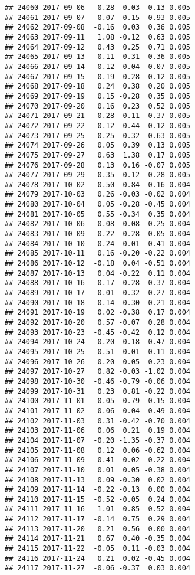 \documentclass[
]{article}
\begin{document}
\begin{verbatim}
## 24060 2017-09-06   0.28 -0.03  0.13 0.005
## 24061 2017-09-07  -0.07  0.15 -0.93 0.005
## 24062 2017-09-08  -0.16  0.03  0.36 0.005
## 24063 2017-09-11   1.08 -0.12  0.63 0.005
## 24064 2017-09-12   0.43  0.25  0.71 0.005
## 24065 2017-09-13   0.11  0.31  0.36 0.005
## 24066 2017-09-14  -0.12 -0.04 -0.07 0.005
## 24067 2017-09-15   0.19  0.28  0.12 0.005
## 24068 2017-09-18   0.24  0.38  0.20 0.005
## 24069 2017-09-19   0.15 -0.28  0.35 0.005
## 24070 2017-09-20   0.16  0.23  0.52 0.005
## 24071 2017-09-21  -0.28  0.11  0.37 0.005
## 24072 2017-09-22   0.12  0.44  0.12 0.005
## 24073 2017-09-25  -0.25  0.32  0.63 0.005
## 24074 2017-09-26   0.05  0.39  0.13 0.005
## 24075 2017-09-27   0.63  1.38  0.17 0.005
## 24076 2017-09-28   0.13  0.16 -0.07 0.005
## 24077 2017-09-29   0.35 -0.12 -0.28 0.005
## 24078 2017-10-02   0.50  0.84  0.16 0.004
## 24079 2017-10-03   0.26 -0.03 -0.02 0.004
## 24080 2017-10-04   0.05 -0.28 -0.45 0.004
## 24081 2017-10-05   0.55 -0.34  0.35 0.004
## 24082 2017-10-06  -0.08 -0.08 -0.25 0.004
## 24083 2017-10-09  -0.22 -0.28 -0.05 0.004
## 24084 2017-10-10   0.24 -0.01  0.41 0.004
## 24085 2017-10-11   0.16 -0.20 -0.22 0.004
## 24086 2017-10-12  -0.18  0.04 -0.51 0.004
## 24087 2017-10-13   0.04 -0.22  0.11 0.004
## 24088 2017-10-16   0.17 -0.28  0.37 0.004
## 24089 2017-10-17   0.01 -0.32 -0.27 0.004
## 24090 2017-10-18   0.14  0.30  0.21 0.004
## 24091 2017-10-19   0.02 -0.38  0.17 0.004
## 24092 2017-10-20   0.57 -0.07  0.28 0.004
## 24093 2017-10-23  -0.45 -0.42  0.12 0.004
## 24094 2017-10-24   0.20 -0.18  0.47 0.004
## 24095 2017-10-25  -0.51 -0.01  0.11 0.004
## 24096 2017-10-26   0.20  0.05  0.23 0.004
## 24097 2017-10-27   0.82 -0.03 -1.02 0.004
## 24098 2017-10-30  -0.46 -0.79 -0.06 0.004
## 24099 2017-10-31   0.23  0.81 -0.22 0.004
## 24100 2017-11-01   0.05 -0.79  0.15 0.004
## 24101 2017-11-02   0.06 -0.04  0.49 0.004
## 24102 2017-11-03   0.31 -0.42 -0.70 0.004
## 24103 2017-11-06   0.06  0.21  0.19 0.004
## 24104 2017-11-07  -0.20 -1.35 -0.37 0.004
## 24105 2017-11-08   0.12  0.06 -0.62 0.004
## 24106 2017-11-09  -0.41 -0.02  0.22 0.004
## 24107 2017-11-10   0.01  0.05 -0.38 0.004
## 24108 2017-11-13   0.09 -0.30  0.02 0.004
## 24109 2017-11-14  -0.22 -0.13  0.00 0.004
## 24110 2017-11-15  -0.52 -0.05  0.24 0.004
## 24111 2017-11-16   1.01  0.85 -0.52 0.004
## 24112 2017-11-17  -0.14  0.75  0.29 0.004
## 24113 2017-11-20   0.21  0.56  0.00 0.004
## 24114 2017-11-21   0.67  0.40 -0.35 0.004
## 24115 2017-11-22  -0.05  0.11 -0.03 0.004
## 24116 2017-11-24   0.21  0.02 -0.45 0.004
## 24117 2017-11-27  -0.06 -0.37  0.03 0.004

\end{verbatim}
\end{document}
